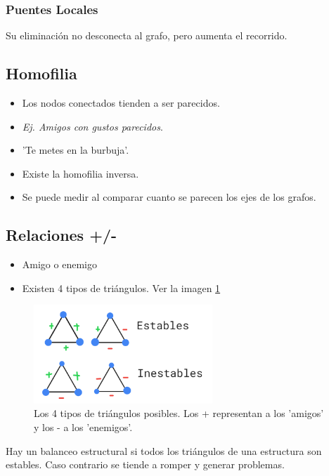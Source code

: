 \documentclass[titlepage,a4paper]{article}
\begin{document}
\subsubsection*{Puentes Locales}
Su eliminación no desconecta al grafo, pero aumenta el recorrido.

\subsection*{Homofilia}
\begin{itemize}
    \item Los nodos conectados tienden a ser parecidos.
    \item \textit{Ej. Amigos con gustos parecidos}.
    \item 'Te metes en la burbuja'.
    \item Existe la homofilia inversa.
    \item Se puede medir al comparar cuanto se parecen los ejes de los grafos.
\end{itemize}

\subsection*{Relaciones +/-}
\begin{itemize}
    \item Amigo o enemigo
    \item Existen 4 tipos de triángulos. Ver la imagen \ref{triangulos}
\end{itemize}

\begin{figure}[!htb]
    \centering
    \includegraphics[width=0.6\textwidth]{imagenesResumen/Triangulos.png}
    \caption{Los 4 tipos de triángulos posibles. Los + representan a los 'amigos' y los - a los 'enemigos'.}
    \label{triangulos}
\end{figure}


Hay un balanceo estructural si todos los triángulos de una estructura son estables. Caso contrario se tiende a romper y generar problemas.
\end{document}
